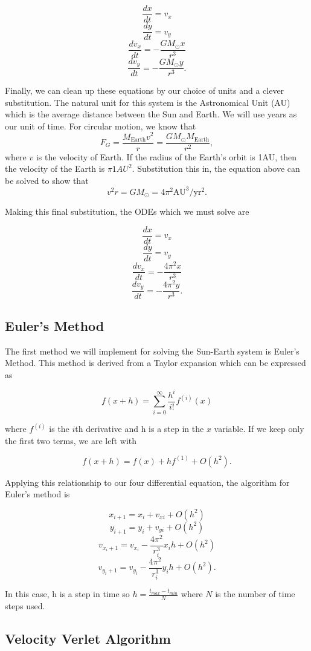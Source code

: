 \documentclass[%
oneside,                 %
final,                   %
10pt]{article}
\begin{document}
\[
\frac{dx}{dt}=v_x
\]
\[
\frac{dy}{dt}=v_y
\]
\[
\frac{dv_x}{dt}=-\frac{GM_{\odot}x}{r^3}
\]
\[
\frac{dv_y}{dt}=-\frac{GM_{\odot}y}{r^3}.
\]

Finally, we can clean up these equations by our choice of units and a clever substitution.  The natural unit for this system is the Astronomical Unit (AU) which is the average distance between the Sun and Earth.  We will use years as our unit of time.  For circular motion, we know that 
\[
F_G= \frac{M_{\mathrm{Earth}}v^2}{r}=\frac{GM_{\odot}M_{\mathrm{Earth}}}{r^2},
\]
where $v$ is the velocity of Earth.  If the radius of the Earth's orbit is 1AU, then the velocity of the Earth is $\pi 1AU^2$.  Substitution this in, the equation above can be solved to show that 
\[
v^2r=GM_{\odot}=4\pi^2\mathrm{AU}^3/\mathrm{yr}^2.
\]

Making this final substitution, the ODEs which we must solve are

\[
\frac{dx}{dt}=v_x
\]
\[
\frac{dy}{dt}=v_y
\]
\[
\frac{dv_x}{dt}=-\frac{4 \pi^2 x}{r^3}
\]
\[
\frac{dv_y}{dt}=-\frac{4 \pi^2 y}{r^3}.
\]


\subsection{Euler's Method}

The first method we will implement for solving the Sun-Earth system is Euler's Method.  This method is derived from a Taylor expansion which can be expressed as 

\[
f(x+h) = \sum_{i=0}^{\infty} \frac{h^i}{i!}f^{(i)}(x)
\]

where $f^{(i)}$ is the $i$th derivative and h is a step in the $x$ variable.  If we keep only the first two terms, we are left with

\[
f(x+h) = f(x) + hf^{(1)} +O(h^2).
\]

Applying this relationship to our four differential equation, the algorithm for Euler's method is

\[
x_{i+1} = x_i +v_{xi} + O(h^2)
\]
\[
y_{i+1} = y_i +v_{yi} + O(h^2)
\]
\[
v_{x_i+1} = v_{x_i} -\frac{4 \pi^2}{r_i^3}x_i h + O(h^2)
\]
\[
v_{y_i+1} = v_{y_i} -\frac{4 \pi^2}{r_i^3}y_i h + O(h^2).
\]

In this case, h is a step in time so $h=\frac{t_{max}-t_{min}}{N}$ where $N$ is the number of time steps used.

\subsection{Velocity Verlet Algorithm}
\end{document}
